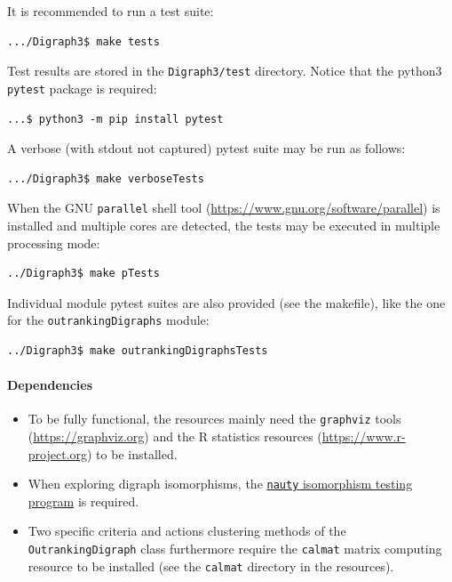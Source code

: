 It is recommended to run a test suite:
\begin{footnotesize}
\begin{verbatim}
.../Digraph3$ make tests
\end{verbatim}
\end{footnotesize}
Test results are stored in the \texttt{Digraph3/test} directory. Notice that the python3 \texttt{pytest} package is required:
\begin{footnotesize}
\begin{verbatim}
...$ python3 -m pip install pytest
\end{verbatim}
\end{footnotesize}
A verbose (with stdout not captured) pytest suite may be run as follows:
\begin{footnotesize}
\begin{verbatim}
.../Digraph3$ make verboseTests
\end{verbatim}
\end{footnotesize}
When the GNU \texttt{parallel} shell tool (\href{https://www.gnu.org/software/parallel}{https://www.gnu.org/software/parallel}) is installed and multiple cores are detected, the tests may be executed in multiple processing mode:
\begin{footnotesize}
\begin{verbatim}
../Digraph3$ make pTests 
\end{verbatim}
\end{footnotesize}
Individual module pytest suites are also provided (see the makefile), like the one for the \texttt{outrankingDigraphs} module:
\begin{footnotesize}
\begin{verbatim}
../Digraph3$ make outrankingDigraphsTests
\end{verbatim}
\end{footnotesize}

\paragraph{Dependencies}
\begin{itemize}
\item To be fully functional, the \Digraph resources mainly need the \texttt{graphviz} tools (\href{https://graphviz.org}{https://graphviz.org}) and the R statistics resources (\href{https://www.r-project.org}{https://www.r-project.org}) to be installed.
\item When exploring digraph isomorphisms, the \href{https://www.cs.sunysb.edu/~algorith/implement/nauty/implement.shtml}{\texttt{nauty} isomorphism testing program} is required.
\item Two specific criteria and actions clustering methods of the \texttt{OutrankingDigraph} class furthermore require the \texttt{calmat} matrix computing resource to be installed (see the \texttt{calmat} directory in the \Digraph resources).
\end{itemize}

